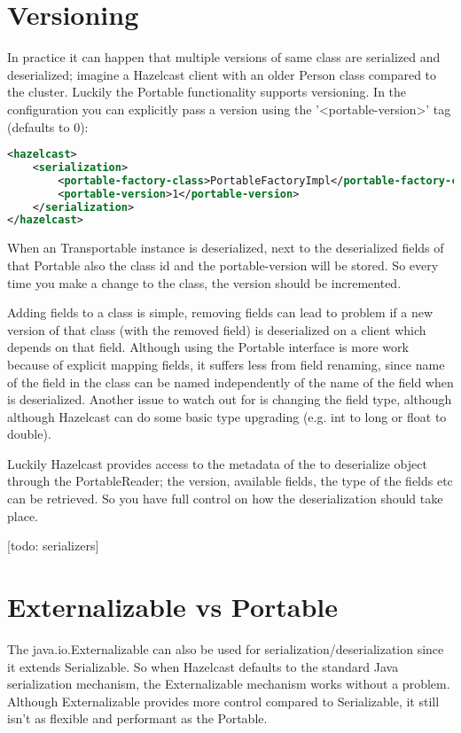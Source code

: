 \section{Versioning}
In practice it can happen that multiple versions of same class are serialized and deserialized; imagine a Hazelcast client with an older Person class compared to the cluster. Luckily the Portable functionality supports versioning. In the configuration you can explicitly pass a version using the '<portable-version>' tag (defaults to 0):
\begin{lstlisting}[language=xml]
<hazelcast>
    <serialization>
        <portable-factory-class>PortableFactoryImpl</portable-factory-class>
        <portable-version>1</portable-version>
    </serialization>
</hazelcast>
\end{lstlisting}
When an Transportable instance is deserialized, next to the deserialized fields of that Portable also the class id and the portable-version will be stored. So every time you make a change to the class, the version should be incremented. 

Adding fields to a class is simple, removing fields can lead to problem if a new version of that class (with the removed field) is deserialized on a client which depends on that field. Although using the Portable interface is more work because of explicit mapping fields, it suffers less from field renaming, since name of the field in the class can be named independently of the name of the field when is deserialized. Another issue to watch out for is changing the field type, although although Hazelcast can do some basic type upgrading (e.g. int to long or float to double). 

Luckily Hazelcast provides access to the metadata of the to deserialize object through the PortableReader; the  version, available fields, the type of the fields etc can be retrieved. So you have full control on how the deserialization should take place. 

[todo: serializers]

\section{Externalizable vs Portable}
The java.io.Externalizable can also be used for serialization/deserialization since it extends Serializable. So when Hazelcast defaults to the standard Java serialization mechanism, the Externalizable mechanism works without a problem. Although Externalizable provides more control compared to Serializable, it still isn't as flexible and performant as the Portable.

